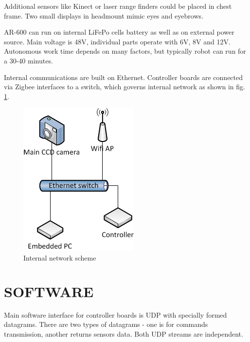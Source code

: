 \documentclass[letterpaper, 10 pt, conference]{ieeeconf}  %
\begin{document}
Additional sensors like Kinect or laser range finders could be placed in chest
frame. Two small displays in headmount mimic eyes and eyebrows.

AR-600 can run on internal LiFePo cells battery as well as on external power
source. Main voltage is 48V, individual parts operate with 6V, 8V and 12V.
Autonomous work time depends on many factors, but typically robot can run for a
30-40 minutes.

Internal communications are built on Ethernet. Controller boards are connected
via Zigbee interfaces to a switch, which governs internal network as shown
in fig. \ref{img:network}.

\begin{figure}[thpb]
\centering

\includegraphics[scale=.5]{EthernetBus}
\caption{Internal network scheme}
\label{img:network}
\end{figure}  

\section{SOFTWARE}

Main software interface for controller boards is UDP with specially formed
datagrams. There are two types of datagrams - one is for commands transmission,
another returns sensors data. Both UDP streams are independent.
\end{document}
